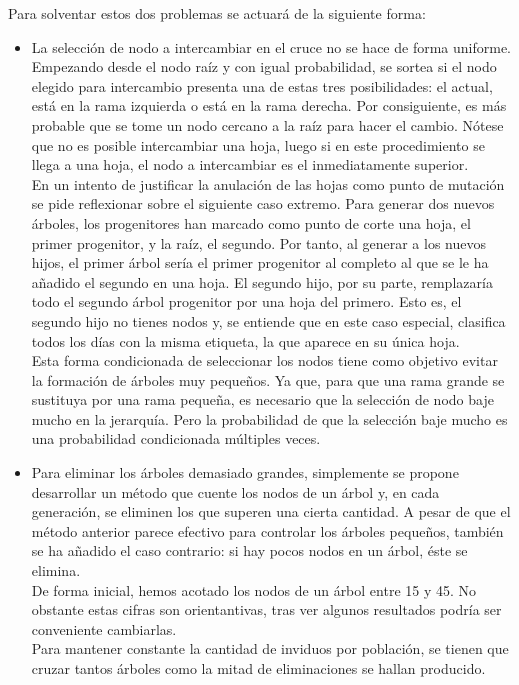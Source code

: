 Para solventar estos dos problemas se actuar\'a de la siguiente forma:\\

\begin{itemize}
    \item La selecci\'on de nodo a intercambiar en el cruce no se hace de forma uniforme. Empezando desde el nodo ra\'iz y con igual probabilidad, se sortea si el nodo elegido para intercambio presenta una de estas tres posibilidades: el actual, est\'a en la rama izquierda o est\'a en la rama derecha. Por consiguiente, es m\'as probable que se tome un nodo cercano a la ra\'iz para hacer el cambio. N\'otese que no es posible intercambiar una hoja, luego si en este procedimiento se llega a una hoja, el nodo a intercambiar es el inmediatamente superior.\\
    
    En un intento de justificar la anulaci\'on de las hojas como punto de mutaci\'on se pide reflexionar sobre el siguiente caso extremo. Para generar dos nuevos \'arboles, los progenitores han marcado como punto de corte una hoja, el primer progenitor, y la ra\'iz, el segundo. Por tanto, al generar a los nuevos hijos, el primer \'arbol ser\'ia el primer progenitor al completo al que se le ha a\~nadido el segundo en una hoja. El segundo hijo, por su parte, remplazar\'ia todo el segundo \'arbol progenitor por una hoja del primero. Esto es, el segundo hijo no tienes nodos y, se entiende que en este caso especial, clasifica todos los d\'ias con la misma etiqueta, la que aparece en su \'unica hoja. \\
    
    Esta forma condicionada de seleccionar los nodos tiene como objetivo evitar la formaci\'on de \'arboles muy peque\~nos. Ya que, para que una rama grande se sustituya por una rama peque\~na, es necesario que la selecci\'on de nodo baje mucho en la jerarqu\'ia. Pero la probabilidad de que la selecci\'on baje mucho es una probabilidad condicionada m\'ultiples veces.\\
    
    \item Para eliminar los \'arboles demasiado grandes, simplemente se propone desarrollar un m\'etodo que cuente los nodos de un \'arbol y, en cada generaci\'on, se eliminen los que superen una cierta cantidad. A pesar de que el m\'etodo anterior parece efectivo para controlar los \'arboles peque\~nos, tambi\'en se ha a\~nadido el caso contrario: si hay pocos nodos en un \'arbol, \'este se elimina. \\
    
    De forma inicial, hemos acotado los nodos de un \'arbol entre 15 y 45. No obstante estas cifras son orientantivas, tras ver algunos resultados podr\'ia ser conveniente cambiarlas.\\
    
    Para mantener constante la cantidad de inviduos por poblaci\'on, se tienen que cruzar tantos \'arboles como la mitad de eliminaciones se hallan producido.\\
\end{itemize}

